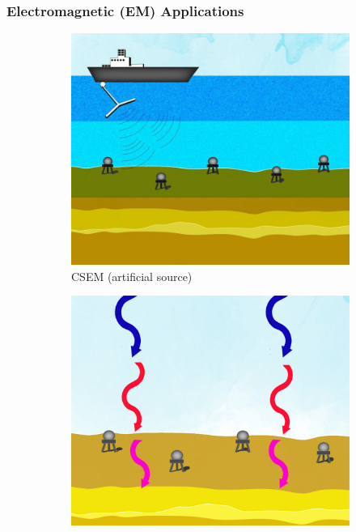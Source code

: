 \begin{frame}
    \frametitle{Electromagnetic (EM) Applications}
    \begin{figure}
        \centering
        \begin{subfigure}[b]{0.4\textwidth}
            \centering
            \includegraphics[width=\textwidth]{Diapos/Intro/Figures/csem}
            \caption{CSEM (artificial source)}
        \end{subfigure}
        \hfill
        \begin{subfigure}[b]{0.4\textwidth}
            \centering
            \includegraphics[width=\textwidth]{Diapos/Intro/Figures/magneto}

\end{subfigure}
\end{figure}
\end{frame}
